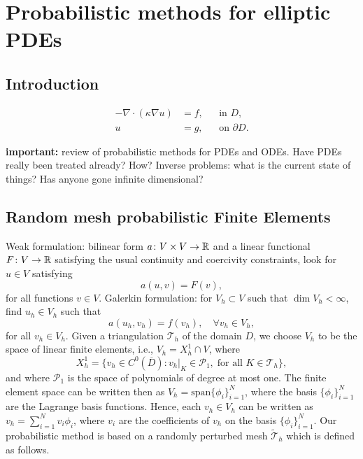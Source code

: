 \chapter{Probabilistic methods for elliptic PDEs}

\section{Introduction}

\todo \cite{AbG20, KeH16, KSH18, CCC16, CGS17}

\begin{equation}\label{eq:ellipticEquation}
\begin{aligned}
	-\nabla \cdot (\kappa \nabla u) &= f, &&\text{in } D,\\
	u &= g, &&\text{on } \partial D.
\end{aligned}
\end{equation}

\textbf{important:} review of probabilistic methods for PDEs and ODEs. Have PDEs really been treated already? How? Inverse problems: what is the current state of things? Has anyone gone infinite dimensional?

\section{Random mesh probabilistic Finite Elements} 

Weak formulation: bilinear form $a\colon V\times V \to \mathbb{R}$ and a linear functional $F\colon V \to \mathbb{R}$ satisfying the usual continuity and coercivity constraints, look for $u \in V$ satisfying
\begin{equation}\label{eq:EXSol}
	a(u, v) = F(v),	
\end{equation}
for all functions $v \in V$. Galerkin formulation: for $V_h \subset V$ such that $\dim V_h < \infty$, find $u_h \in V_h$ such that
\begin{equation}\label{eq:FEMSol}
	a(u_h, v_h) = f(v_h), \quad \forall v_h \in V_h,
\end{equation}
for all $v_h \in V_h$. Given a triangulation $\mathcal T_h$ of the domain $D$, we choose $V_h$ to be the space of linear finite elements, i.e., $V_h = X_h^1 \cap V$, where 
\begin{equation}
	X_h^1 = \{v_h \in C^0(\overline D) \colon v_h|_{K} \in \mathcal P_1, \; \text{for all } K \in \mathcal T_h\},
\end{equation}
and where $\mathcal P_1$ is the space of polynomials of degree at most one. The finite element space can be written then as $V_h = \mathrm{span}\{\phi_i\}_{i=1}^N$, where the basis $\{\phi_i\}_{i=1}^N$ are the Lagrange basis functions. Hence, each $v_h \in V_h$ can be written as $v_h = \sum_{i=1}^N v_i \phi_i$, where $v_i$ are the coefficients of $v_h$ on the basis $\{\phi_i\}_{i=1}^N$. Our probabilistic method is based on a randomly perturbed mesh $\widetilde {\mathcal T}_h$ which is defined as follows.

